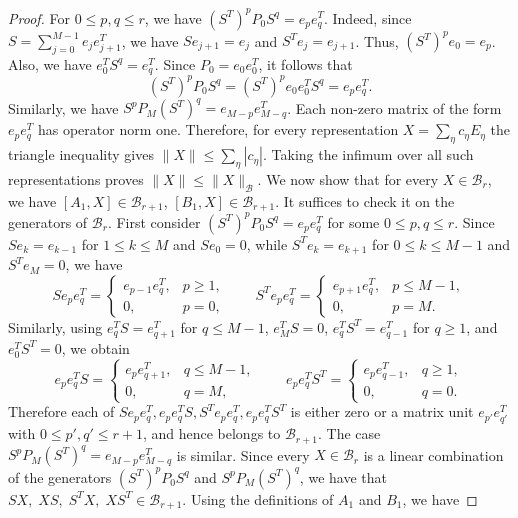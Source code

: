 \documentclass[10pt,reqno]{article}
\numberwithin{equation}{section}
\theoremstyle{plain}
\theoremstyle{definition}
\begin{document}
\begin{proof}
For \(0\leq p,q\leq r\), we have $(S^T)^pP_0S^q=e_pe_q^T$.
Indeed, since \(S=\sum_{j=0}^{M-1}e_je_{j+1}^T\), we have $Se_{j+1}=e_j$ and $S^T e_j=e_{j+1}$. Thus, $(S^T)^pe_0=e_p$. Also, we have $e_0^TS^q=e_q^T$. Since \(P_0=e_0e_0^T\), it follows that
\begin{equation}
(S^T)^pP_0S^q = (S^T)^p e_0 e_0^T S^q = e_pe_q^T.
\end{equation}
Similarly, we have $S^pP_M(S^T)^q=e_{M-p}e_{M-q}^T$. Each non-zero matrix of the form $e_pe_q^T$ has operator norm one. Therefore, for every representation \(X=\sum_\eta c_\eta E_\eta\) the triangle inequality gives $\|X\|\leq \sum_\eta |c_\eta|$. Taking the infimum over all such representations proves $\|X\|\leq \|X\|_{\mathcal B}$. We now show that for every \(X\in\mathcal B_r\), we have $[A_1,X]\in\mathcal B_{r+1}$, $[B_1,X]\in\mathcal B_{r+1}$. It suffices to check it on the generators of \(\mathcal B_r\). First consider $(S^T)^pP_0S^q=e_pe_q^T$ for some $0\leq p,q\leq r$. Since \(S e_k=e_{k-1}\) for \(1\leq k\leq M\) and \(S e_0=0\), while \(S^T e_k=e_{k+1}\) for \(0\leq k\leq M-1\) and \(S^T e_M=0\), we have
\begin{equation}
S e_p e_q^T = \begin{cases} e_{p-1}e_q^T, & p\geq1,\\ 0, & p=0, \end{cases} \quad \quad S^T e_p e_q^T = \begin{cases} e_{p+1}e_q^T, & p\leq M-1,\\ 0, & p=M. \end{cases}
\end{equation}
Similarly, using \(e_q^T S = e_{q+1}^T\) for \(q \leq M-1\), \(e_M^T S = 0\), \(e_q^T S^T = e_{q-1}^T\) for \(q \geq 1\), and \(e_0^T S^T = 0\), we obtain
\begin{equation}
e_p e_q^TS = \begin{cases} e_pe_{q+1}^T, & q\leq M-1,\\ 0, & q=M, \end{cases} \quad \quad e_p e_q^T S^T = \begin{cases} e_pe_{q-1}^T, & q\geq1,\\ 0, & q=0. \end{cases}
\end{equation}
Therefore each of $S e_pe_q^T, e_pe_q^TS,  S^Te_pe_q^T, e_pe_q^TS^T$ is either zero or a matrix unit \(e_{p'}e_{q'}^T\) with \(0 \leq p',q' \leq r+1\), and hence belongs to \(\mathcal B_{r+1}\). The case \(S^p P_M (S^T)^q = e_{M-p}e_{M-q}^T\) is similar. Since every \(X\in\mathcal B_r\) is a linear combination of the generators \((S^T)^pP_0S^q\) and \(S^p P_M (S^T)^q\), we have that $SX,\;XS,\;S^T X,\;XS^T\in\mathcal B_{r+1}$. Using the definitions of \(A_1\) and \(B_1\), we have

\end{proof}
\end{document}
